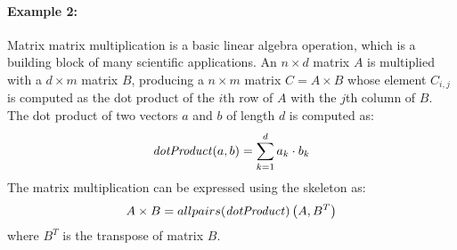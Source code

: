 \paragraph{Example 2:}
Matrix matrix multiplication is a basic linear algebra operation, which is a building block of many scientific applications.
An $n\times d$ matrix $A$ is multiplied with a $d\times m$ matrix $B$, producing a $n\times m$ matrix $C=A\times B$ whose element $C_{i,j}$ is computed as the dot product of the $i$th row of $A$ with the $j$th column of $B$.
The dot product of two vectors $a$ and $b$ of length $d$ is computed as:
\begin{equation}
  \mbox{\emph{dotProduct}} (a,b) = \sum_{k=1}^d a_k \cdot b_k
\end{equation}
The matrix multiplication can be expressed using the \allpairs skeleton as:
\begin{equation}
  A\times B = allpairs(\mbox{\emph{dotProduct}})\left(A, B^T\right)
  \label{eq:mat_mult_allpairs}
\end{equation}
where $B^T$ is the transpose of matrix $B$.

% 



